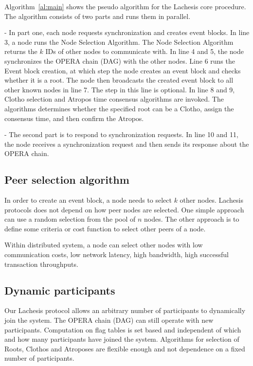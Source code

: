 \documentclass{article}
\begin{document}
Algorithm~\ref{al:main} shows the pseudo algorithm for the Lachesis core procedure. The algorithm consists of two parts and runs them in parallel.

- In part one, each node requests synchronization and creates event blocks. In line 3, a node runs the Node Selection Algorithm. The Node Selection Algorithm returns the $k$ IDs of other nodes to communicate with. In line 4 and 5, the node synchronizes the OPERA chain (DAG) with the other nodes. Line 6 runs the Event block creation, at which step the node creates an event block and checks whether it is a root. The node then broadcasts the created event block to all other known nodes in line 7. The step in this line is optional. In line 8 and 9, Clotho selection and Atropos time consensus algorithms are invoked. The algorithms determines whether the specified root can be a Clotho, assign the consensus time, and then confirm the Atropos. 

- The second part is to respond to synchronization requests. In line 10 and 11, the node receives a synchronization request and then sends its response about the OPERA chain.

\subsection{Peer selection algorithm}
In order to create an event block, a node needs to select $k$ other nodes. Lachesis protocols does not depend on how peer nodes are selected. One simple approach can use a random selection from the pool of $n$ nodes. The other approach is to define some criteria or cost function to select other peers of a node. 

Within distributed system, a node can select other nodes with low communication costs, low network latency, high bandwidth, high successful transaction throughputs.

\subsection{Dynamic participants}
Our Lachesis protocol allows an arbitrary number of participants to dynamically join the system. The OPERA chain (DAG) can still operate with new participants. Computation on flag tables is set based and independent of which and how many participants have joined the system. Algorithms for selection of Roots, Clothos and Atroposes are flexible enough and not dependence on a fixed number of participants.

\newpage
\end{document}
